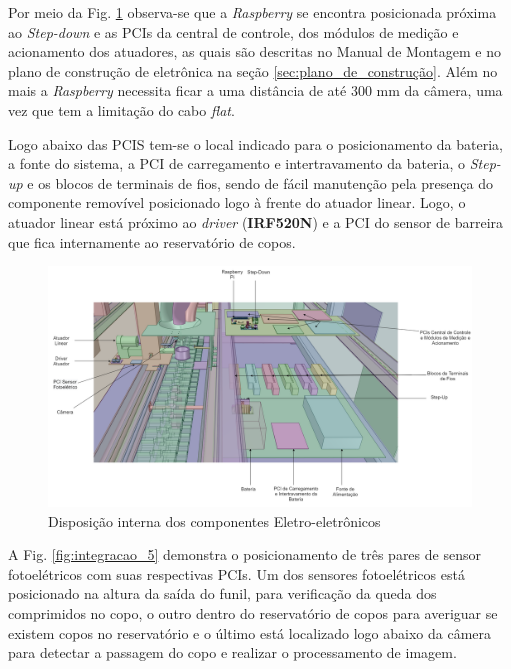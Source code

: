  Por meio da Fig. \ref{fig:integracao_3} observa-se que a \textit{Raspberry} se encontra posicionada próxima
 ao \textit{Step-down} e as PCIs da central de controle, dos módulos de medição e acionamento dos atuadores, as quais são descritas no Manual de Montagem e no plano de construção de eletrônica na seção \ref{sec:plano_de_construção}. Além no mais a \textit{Raspberry} necessita ficar a uma distância de até 300 mm da câmera, uma vez que tem a limitação do cabo \textit{flat}. 
 
 Logo abaixo das PCIS tem-se o local indicado para o posicionamento da bateria, a fonte do sistema, a PCI de carregamento e intertravamento da bateria, o \textit{Step-up} e os blocos de terminais de fios, sendo de fácil manutenção pela presença do componente removível posicionado logo à frente do atuador linear. Logo, o atuador linear  está próximo ao \textit{driver} (\textbf{IRF520N}) e a PCI do sensor de barreira que fica internamente ao reservatório de copos. 
    \begin{figure}[H]
        \centering
        \includegraphics[width=\textwidth]{figuras/integracao/Integracao_3.png} 
        \caption{Disposição interna dos componentes Eletro-eletrônicos}
        \label{fig:integracao_3}
    \end{figure}
    
    \hspace{5cm}
    
    A Fig. \ref{fig:integracao_5} demonstra o posicionamento de três pares de sensor fotoelétricos com suas respectivas PCIs. Um dos sensores fotoelétricos está posicionado na altura da saída do funil, para verificação da queda dos comprimidos no copo, o outro dentro do reservatório de copos para averiguar se existem copos no reservatório e o último está localizado logo abaixo da câmera para detectar a passagem do copo e realizar o processamento de imagem. 
    
